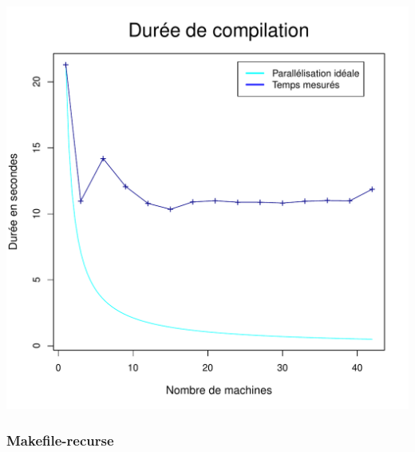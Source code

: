 \documentclass[a4paper, 11pt, titlepage]{article}
\begin{document}
\begin{center}
    \includegraphics[scale=0.55]{res/sujet_makefiles_blender_249_Makefile_nth8.pdf}
\end{center}


\subsubsection {Makefile-recurse}
\end{document}
